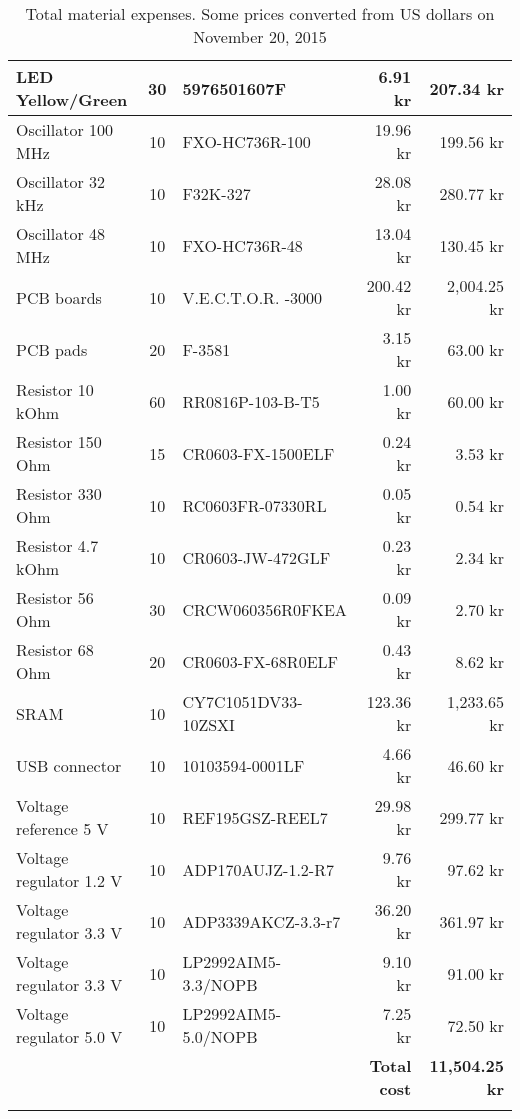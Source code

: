 \begin{longtable}{|p{3cm}|c|p{4.3cm}|r|r|}
    LED Yellow/Green        & 30    & 5976501607F               & 6.91 kr    & 207.34 kr   \\ \hline
    Oscillator 100 MHz      & 10    & FXO-HC736R-100	        & 19.96 kr   & 199.56 kr   \\ \hline
    Oscillator 32 kHz       & 10    & F32K-327	                & 28.08 kr   & 280.77 kr   \\ \hline
    Oscillator 48 MHz       & 10    & FXO-HC736R-48	            & 13.04 kr   & 130.45 kr   \\ \hline
    PCB boards              & 10    & V.E.C.T.O.R. -3000        & 200.42 kr  & 2,004.25 kr \\ \hline
    PCB pads                & 20    & F-3581                    & 3.15 kr    & 63.00 kr    \\ \hline
    Resistor 10 kOhm        & 60    & RR0816P-103-B-T5	        & 1.00 kr    & 60.00 kr    \\ \hline
    Resistor 150 Ohm        & 15    & CR0603-FX-1500ELF	        & 0.24 kr    & 3.53 kr     \\ \hline
    Resistor 330 Ohm        & 10    & RC0603FR-07330RL	        & 0.05 kr    & 0.54 kr     \\ \hline
    Resistor 4.7 kOhm       & 10    & CR0603-JW-472GLF	        & 0.23 kr    & 2.34 kr     \\ \hline
    Resistor 56 Ohm         & 30    & CRCW060356R0FKEA	        & 0.09 kr    & 2.70 kr     \\ \hline
    Resistor 68 Ohm         & 20    & CR0603-FX-68R0ELF	        & 0.43 kr    & 8.62 kr     \\ \hline
    SRAM                    & 10    & CY7C1051DV33-10ZSXI	    & 123.36 kr  & 1,233.65 kr \\ \hline
    USB connector           & 10    & 10103594-0001LF	        & 4.66 kr    & 46.60 kr    \\ \hline
    Voltage reference 5 V   & 10    & REF195GSZ-REEL7	        & 29.98 kr   & 299.77 kr   \\ \hline
    Voltage regulator 1.2 V & 10    & ADP170AUJZ-1.2-R7	        & 9.76 kr    & 97.62 kr    \\ \hline
    Voltage regulator 3.3 V & 10    & ADP3339AKCZ-3.3-r7	    & 36.20 kr   & 361.97 kr   \\ \hline
    Voltage regulator 3.3 V & 10    & LP2992AIM5-3.3/NOPB	    & 9.10 kr    & 91.00 kr    \\ \hline
    Voltage regulator 5.0 V & 10    & LP2992AIM5-5.0/NOPB	    & 7.25 kr    & 72.50 kr    \\ \hline \hline
    ~                       & ~     & ~   & \textbf{Total cost} & \textbf{11,504.25 kr}	   \\ \hline \hline
\caption{Total material expenses. Some prices converted from US dollars on November 20, 2015}
\end{longtable}
